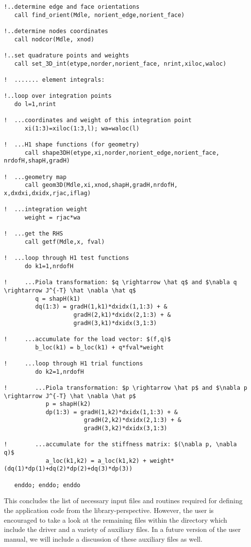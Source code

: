 \begin{itemize}
{\begin{lstlisting}[mathescape,caption=\file{POISSON/GALERKIN/}\routine{elem} routine]
!..determine edge and face orientations
   call find_orient(Mdle, norient_edge,norient_face)
   
!..determine nodes coordinates
   call nodcor(Mdle, xnod)
   
!..set quadrature points and weights
   call set_3D_int(etype,norder,norient_face, nrint,xiloc,waloc)

!  ....... element integrals:

!..loop over integration points
   do l=1,nrint

!  ...coordinates and weight of this integration point
      xi(1:3)=xiloc(1:3,l); wa=waloc(l)

!  ...H1 shape functions (for geometry)
      call shape3DH(etype,xi,norder,norient_edge,norient_face, nrdofH,shapH,gradH)

!  ...geometry map
      call geom3D(Mdle,xi,xnod,shapH,gradH,nrdofH, x,dxdxi,dxidx,rjac,iflag)

!  ...integration weight
      weight = rjac*wa

!  ...get the RHS
      call getf(Mdle,x, fval)

!  ...loop through H1 test functions
      do k1=1,nrdofH

!     ...Piola transformation: $q \rightarrow \hat q$ and $\nabla q \rightarrow J^{-T} \hat \nabla \hat q$
         q = shapH(k1)
         dq(1:3) = gradH(1,k1)*dxidx(1,1:3) + &
                    gradH(2,k1)*dxidx(2,1:3) + &
                    gradH(3,k1)*dxidx(3,1:3)

!     ...accumulate for the load vector: $(f,q)$
         b_loc(k1) = b_loc(k1) + q*fval*weight

!     ...loop through H1 trial functions
         do k2=1,nrdofH

!        ...Piola transformation: $p \rightarrow \hat p$ and $\nabla p \rightarrow J^{-T} \hat \nabla \hat p$
            p = shapH(k2)
            dp(1:3) = gradH(1,k2)*dxidx(1,1:3) + &
                       gradH(2,k2)*dxidx(2,1:3) + &
                       gradH(3,k2)*dxidx(3,1:3)

!        ...accumulate for the stiffness matrix: $(\nabla p, \nabla q)$
            a_loc(k1,k2) = a_loc(k1,k2) + weight*(dq(1)*dp(1)+dq(2)*dp(2)+dq(3)*dp(3))

   enddo; enddo; enddo
\end{lstlisting}
	}
\end{itemize}

This concludes the list of necessary input files and routines required for defining the application code from the library-perspective. However, the user is encouraged to take a look at the remaining files within the  directory which include the driver  and a variety of auxiliary files. In a future version of the user manual, we will include a discussion of these auxiliary files as well.

